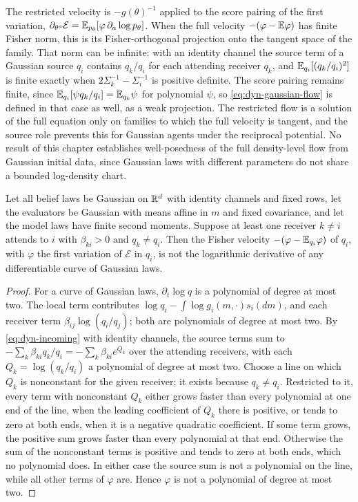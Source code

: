 The restricted velocity is $-g(\theta)^{-1}$ applied to the score pairing of the first variation, $\partial_{\theta^a}\mathcal E=\mathbb E_{p_\theta}[\varphi\,\partial_a\log p_\theta]$. When the full velocity $-(\varphi-\mathbb E\varphi)$ has finite Fisher norm, this is its Fisher-orthogonal projection onto the tangent space of the family. That norm can be infinite: with an identity channel the source term of a Gaussian source $q_i$ contains $q_k/q_i$ for each attending receiver $q_k$, and $\mathbb E_{q_i}[(q_k/q_i)^2]$ is finite exactly when $2\Sigma_k^{-1}-\Sigma_i^{-1}$ is positive definite. The score pairing remains finite, since $\mathbb E_{q_i}[\psi q_k/q_i]=\mathbb E_{q_k}\psi$ for polynomial $\psi$, so \cref{eq:dyn-gaussian-flow} is defined in that case as well, as a weak projection. The restricted flow is a solution of the full equation only on families to which the full velocity is tangent, and the source role prevents this for Gaussian agents under the reciprocal potential. No result of this chapter establishes well-posedness of the full density-level flow from Gaussian initial data, since Gaussian laws with different parameters do not share a bounded log-density chart.

Let all belief laws be Gaussian on $\mathbb R^d$ with identity channels and fixed rows, let the evaluators be Gaussian with means affine in $m$ and fixed covariance, and let the model laws have finite second moments. Suppose at least one receiver $k\neq i$ attends to $i$ with $\beta_{ki}>0$ and $q_k\neq q_i$. Then the Fisher velocity $-(\varphi-\mathbb E_{q_i}\varphi)$ of $q_i$, with $\varphi$ the first variation of $\mathcal E$ in $q_i$, is not the logarithmic derivative of any differentiable curve of Gaussian laws.
\begin{proof}
For a curve of Gaussian laws, $\partial_t\log q$ is a polynomial of degree at most two. The local term contributes $\log q_i-\int\log g_i(m,\cdot)s_i(dm)$, and each receiver term $\beta_{ij}\log(q_i/q_j)$; both are polynomials of degree at most two. By \cref{eq:dyn-incoming} with identity channels, the source terms sum to $-\sum_k\beta_{ki}q_k/q_i=-\sum_k\beta_{ki}e^{Q_k}$ over the attending receivers, with each $Q_k=\log(q_k/q_i)$ a polynomial of degree at most two. Choose a line on which $Q_k$ is nonconstant for the given receiver; it exists because $q_k\neq q_i$. Restricted to it, every term with nonconstant $Q_k$ either grows faster than every polynomial at one end of the line, when the leading coefficient of $Q_k$ there is positive, or tends to zero at both ends, when it is a negative quadratic coefficient. If some term grows, the positive sum grows faster than every polynomial at that end. Otherwise the sum of the nonconstant terms is positive and tends to zero at both ends, which no polynomial does. In either case the source sum is not a polynomial on the line, while all other terms of $\varphi$ are. Hence $\varphi$ is not a polynomial of degree at most two.
\end{proof}

